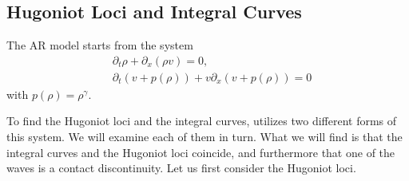 \documentclass{article}
\begin{document}
\subsection{Hugoniot Loci and Integral Curves}
The AR model starts from the system
\begin{align}
&\partial_t\rho + \partial_x(\rho v) = 0, \label{AR:eq1}\\
&\partial_t \left(v + p(\rho )\right) + v\partial_x \left( v + p(\rho )\right) = 0\label{AR:eq1.5}
\end{align}
with $p(\rho) = \rho^\gamma$.

To find the Hugoniot loci and the integral curves, \cite{AwRascle2000} utilizes two different forms of this system. 
We will examine each of them in turn. What we will find is that the integral curves and the Hugoniot loci coincide, 
and furthermore that one of the waves is a contact discontinuity. Let us first consider the Hugoniot loci. 
\end{document}
